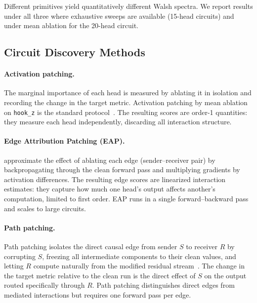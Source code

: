\documentclass{article}
\begin{document}
Different primitives yield quantitatively different Walsh spectra. We
report results under all three where exhaustive sweeps are available
(15-head circuits) and under mean ablation for the 20-head circuit.

\subsection{Circuit Discovery Methods}
\label{sec:discovery-methods}

\paragraph{Activation patching.}

The marginal importance of each head is measured by ablating it in
isolation and recording the change in the target metric. Activation
patching by mean ablation on \texttt{hook\_z} is the standard
protocol~\citep{wang2022ioi}. The resulting scores are order-1
quantities: they measure each head independently, discarding all
interaction structure.

\paragraph{Edge Attribution Patching (EAP).}

\citet{syed2023attribution} approximate the effect of ablating each
edge (sender--receiver pair) by backpropagating through the clean
forward pass and multiplying gradients by activation differences. The
resulting edge scores are linearized interaction estimates: they
capture how much one head's output affects another's computation,
limited to first order. EAP runs in a single forward--backward pass and
scales to large circuits.

\paragraph{Path patching.}

Path patching isolates the direct causal edge from sender $S$ to
receiver $R$ by corrupting $S$, freezing all intermediate components to
their clean values, and letting $R$ compute naturally from the modified
residual stream~\citep{wang2022ioi}. The change in the target metric
relative to the clean run is the direct effect of $S$ on the output
routed specifically through $R$. Path patching distinguishes direct
edges from mediated interactions but requires one forward pass per edge.
\end{document}
